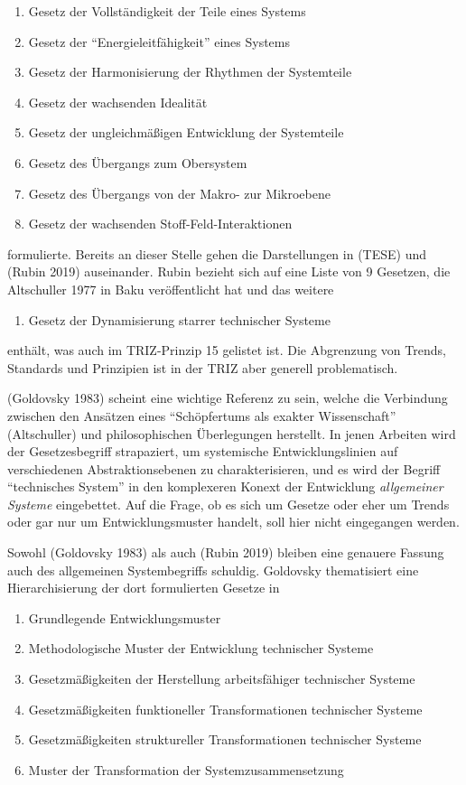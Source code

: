 \documentclass[11pt,a4paper]{article}
\begin{document}
\begin{enumerate}
[noitemsep]
\item
  Gesetz der Vollständigkeit der Teile eines Systems
\item
  Gesetz der ``Energieleitfähigkeit'' eines Systems
\item
  Gesetz der Harmonisierung der Rhythmen der Systemteile
\item
  Gesetz der wachsenden Idealität
\item
  Gesetz der ungleichmäßigen Entwicklung der Systemteile
\item
  Gesetz des Übergangs zum Obersystem
\item
  Gesetz des Übergangs von der Makro- zur Mikroebene
\item
  Gesetz der wachsenden Stoff-Feld-Interaktionen
\end{enumerate}

formulierte. Bereits an dieser Stelle gehen die Darstellungen in (TESE)
und (Rubin 2019) auseinander. Rubin bezieht sich auf eine Liste von 9
Gesetzen, die Altschuller 1977 in Baku veröffentlicht hat und das
weitere

\begin{enumerate}
[noitemsep]
\item
  Gesetz der Dynamisierung starrer technischer Systeme
\end{enumerate}

enthält, was auch im TRIZ-Prinzip 15 gelistet ist. Die Abgrenzung von
Trends, Standards und Prinzipien ist in der TRIZ aber generell
problematisch.

(Goldovsky 1983) scheint eine wichtige Referenz zu sein, welche die
Verbindung zwischen den Ansätzen eines ``Schöpfertums als exakter
Wissenschaft'' (Altschuller) und philosophischen Überlegungen herstellt.
In jenen Arbeiten wird der Gesetzesbegriff strapaziert, um systemische
Entwicklungslinien auf verschiedenen Abstraktionsebenen zu
charakterisieren, und es wird der Begriff ``technisches System'' in den
komplexeren Konext der Entwicklung \emph{allgemeiner Systeme}
eingebettet. Auf die Frage, ob es sich um Gesetze oder eher um Trends
oder gar nur um Entwicklungsmuster handelt, soll hier nicht eingegangen
werden.

Sowohl (Goldovsky 1983) als auch (Rubin 2019) bleiben eine genauere
Fassung auch des allgemeinen Systembegriffs schuldig. Goldovsky
thematisiert eine Hierarchisierung der dort formulierten Gesetze in

\begin{enumerate}
[noitemsep]
\item
  Grundlegende Entwicklungsmuster
\item
  Methodologische Muster der Entwicklung technischer Systeme
\item
  Gesetzmäßigkeiten der Herstellung arbeitsfähiger technischer Systeme
\item
  Gesetzmäßigkeiten funktioneller Transformationen technischer Systeme
\item
  Gesetzmäßigkeiten struktureller Transformationen technischer Systeme
\item
  Muster der Transformation der Systemzusammensetzung
\end{enumerate}
\end{document}
